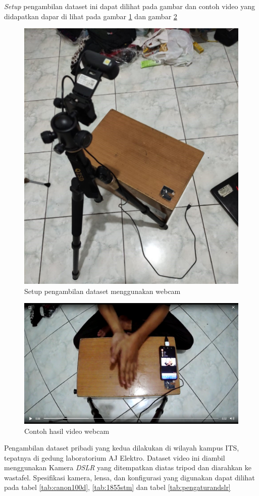 \textit{Setup} pengambilan dataset ini dapat dilihat pada gambar dan contoh video yang didapatkan dapar di lihat pada gambar \ref{fig:webcam2} dan gambar \ref{fig:contohwebcam}

\begin{figure}[!ht]
	\centering
	\includegraphics[width=0.7\columnwidth]{gambar/webcam2.jpeg}
	\caption{Setup pengambilan dataset menggunakan webcam}
	\label{fig:webcam2}
\end{figure}

\begin{figure}[!ht]
	\centering
	\includegraphics[width=0.8\columnwidth]{gambar/contohwebcam1.png}
	\caption{Contoh hasil video webcam}
	\label{fig:contohwebcam}
\end{figure}

Pengambilan dataset pribadi yang kedua dilakukan di wilayah kampus ITS, tepatnya di gedung laboratorium AJ Elektro. Dataset video ini diambil menggunakan Kamera \textit{DSLR} yang ditempatkan diatas tripod dan diarahkan ke wastafel. Spesifikasi kamera, lensa, dan konfigurasi yang digunakan dapat dilihat pada tabel \ref{tab:canon100d}, \ref{tab:1855stm} dan tabel \ref{tab:pengaturandslr}


